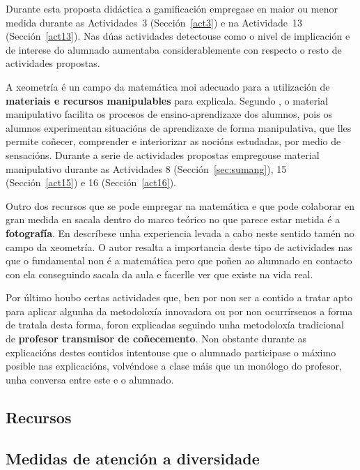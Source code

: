 Durante esta proposta didáctica a gamificación empregase en maior ou menor medida durante as Actividades~3 (Sección~\ref{act3}) e na Actividade~13 (Sección~\ref{act13}). Nas dúas actividades detectouse como o nivel de implicación e de interese do alumnado aumentaba considerablemente con respecto o resto de actividades propostas.

A xeometría é un campo da matemática moi adecuado para a utilización de \textbf{materiais e recursos manipulables} para explicala. Segundo \cite{moreiro2010materiales},  o material manipulativo facilita os procesos de ensino-aprendizaxe dos alumnos, pois os alumnos experimentan situacións de aprendizaxe de forma manipulativa, que lles permite coñecer, comprender e interiorizar as nocións estudadas, por medio de sensacións. Durante a serie de actividades propostas empregouse material manipulativo durante as Actividades 8 (Sección~\ref{sec:sumang}), 15 (Sección~\ref{act15}) e 16 (Sección~\ref{act16}).

Outro dos recursos que se pode empregar na matemática e que pode colaborar en gran medida en sacala dentro do marco teórico no que parece estar metida é a \textbf{fotografía}. En \cite{gonzalez1989fotografia} descríbese unha experiencia levada a cabo neste sentido tamén no campo da xeometría. O autor resalta a importancia deste tipo de actividades nas que o fundamental non é a matemática pero que poñen ao alumnado en contacto con ela conseguindo sacala da aula e facerlle ver que existe na vida real.

Por último houbo certas actividades que, ben por non ser a contido a tratar apto para aplicar algunha da metodoloxía innovadora ou por non ocurrírsenos a forma de tratala desta forma, foron explicadas seguindo unha metodoloxía tradicional de \textbf{profesor transmisor de coñecemento}. Non obstante durante as explicacións destes contidos intentouse que o alumnado participase o máximo posible nas explicacións, volvéndose a clase máis que un monólogo do profesor, unha conversa entre este e o alumnado.

\subsection{Recursos}


\subsection{Medidas de atención a diversidade}


